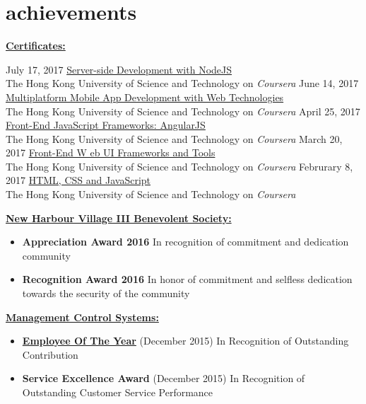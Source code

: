 \documentclass[]{friggeri-cvRS}
\begin{document}
\section{achievements}
\textbf{\underline{Certificates:}}
	\begin{entrylist}
	\entry	
		{July 17, 2017}
		{\href{https://www.coursera.org/account/accomplishments/certificate/XCJWYF6B9RE7}{Server-side Development with NodeJS}}
		{\\The Hong Kong University of Science and Technology on \emph{Coursera}}{}
	\entry	
		{June 14, 2017}
		{\href{https://www.coursera.org/account/accomplishments/certificate/5PBDCAG9K42S}{Multiplatform Mobile App Development with Web Technologies}}
		{\\The Hong Kong University of Science and Technology on \emph{Coursera}}{}
	\entry	
		{April 25, 2017}
		{\href{https://www.coursera.org/account/accomplishments/certificate/44H3T6RYXUET}{Front-End JavaScript Frameworks: AngularJS}}
		{\\The Hong Kong University of Science and Technology on \emph{Coursera}}{}
	\entry	
		{March 20, 2017}
		{\href{https://www.coursera.org/account/accomplishments/certificate/RABKZD4F7DVB}{Front-End W eb UI Frameworks and Tools}}
		{\\The Hong Kong University of Science and Technology on \emph{Coursera}}{}
	\entry	
		{Februrary 8, 2017}
		{\href{https://www.coursera.org/account/accomplishments/certificate/KB222U54JKWU}{HTML, CSS and JavaScript}}
		{\\The Hong Kong University of Science and Technology on \emph{Coursera}}{}
	\end{entrylist}
\textbf{\underline{New Harbour Village III Benevolent Society:}}
	\begin{itemize}
		\item \textbf{Appreciation Award 2016} In recognition of commitment and dedication community
		\item \textbf{Recognition Award 2016} In honor of commitment and selfless dedication towards the security of the community
	\end{itemize}
\textbf{\underline{Management Control Systems:}}
	\begin{itemize}
		\item \textbf{\href{http://www.jamaicaobserver.com/news/MC-Systems-awards}{Employee Of The Year}} (December 2015) In Recognition of Outstanding Contribution
		\item \textbf{Service Excellence Award} (December 2015) In Recognition of Outstanding Customer Service Performance
	\end{itemize}
\end{document}
